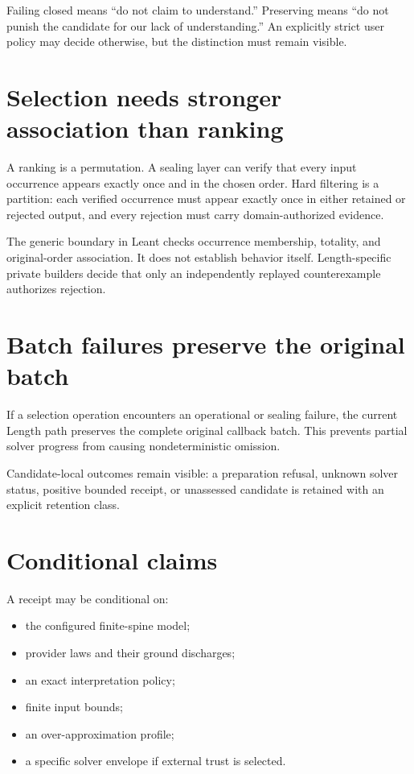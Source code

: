 \documentclass[10pt,letterpaper,oneside]{report}
\newcommand{\code}[1]{\texttt{\detokenize{#1}}}
\begin{document}
Failing closed means ``do not claim to understand.'' Preserving means ``do not punish the candidate for our lack of understanding.'' An explicitly strict user policy may decide otherwise, but the distinction must remain visible.

\section{Selection needs stronger association than ranking}

A ranking is a permutation. A sealing layer can verify that every input occurrence appears exactly once and in the chosen order. Hard filtering is a partition: each verified occurrence must appear exactly once in either retained or rejected output, and every rejection must carry domain-authorized evidence.

The generic \code{BehavioralSelection} boundary in Leant checks occurrence membership, totality, and original-order association. It does not establish behavior itself. Length-specific private builders decide that only an independently replayed counterexample authorizes rejection.

\section{Batch failures preserve the original batch}

If a selection operation encounters an operational or sealing failure, the current Length path preserves the complete original callback batch. This prevents partial solver progress from causing nondeterministic omission.

Candidate-local outcomes remain visible: a preparation refusal, unknown solver status, positive bounded receipt, or unassessed candidate is retained with an explicit retention class.

\section{Conditional claims}

A receipt may be conditional on:

\begin{itemize}
\item the configured finite-spine model;
\item provider laws and their ground discharges;
\item an exact interpretation policy;
\item finite input bounds;
\item an over-approximation profile;
\item a specific solver envelope if external trust is selected.
\end{itemize}
\end{document}
